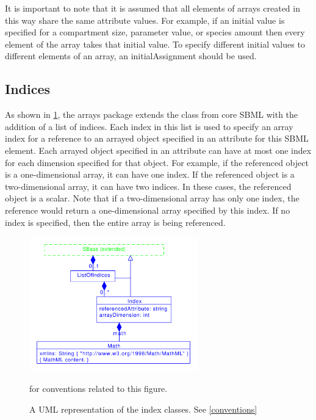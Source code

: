 It is important to note that it is assumed that all elements of arrays created in this way share the same attribute values.  For example, if an initial value is specified for a compartment size, parameter value, or species amount then every element of the array takes that initial value.  To specify different initial values to different elements of an array, an initialAssignment should be used. 

\subsection{Indices}
\label{sec:index}

As shown in \ref{fig:indices_uml}, the arrays package extends the \SBase class from core SBML with the addition of a list of indices.  Each index in this list is used to specify an array index for a reference to an arrayed object specified in an attribute for this SBML element.    Each arrayed object specified in an attribute can have at most one index for each dimension specified for that object.  
For example, if the referenced object is a one-dimensional array, it can have one index.  If the referenced object is a two-dimensional array, it can have two indices.  In these cases, the referenced object is a scalar.  Note that if a two-dimensional array has only one index, the reference would return a one-dimensional array specified by this index.  If no index is specified, then the entire array is being referenced.  

\begin{figure}[tbhp]
  \centering
  \includegraphics[width=0.65\textwidth]{images/indicesUML.pdf}\\
  \caption{A UML representation of the index classes. See \ref{conventions}} for conventions related to this figure. \label{fig:indices_uml}
\end{figure}

